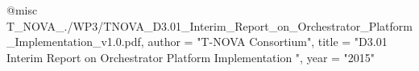 @misc{ T_NOVA_./WP3/TNOVA_D3.01_Interim_Report_on_Orchestrator_Platform_Implementation_v1.0.pdf,
       author = "T-NOVA Consortium",
       title = "D3.01 Interim Report on Orchestrator Platform Implementation ",
       year = "2015" }
